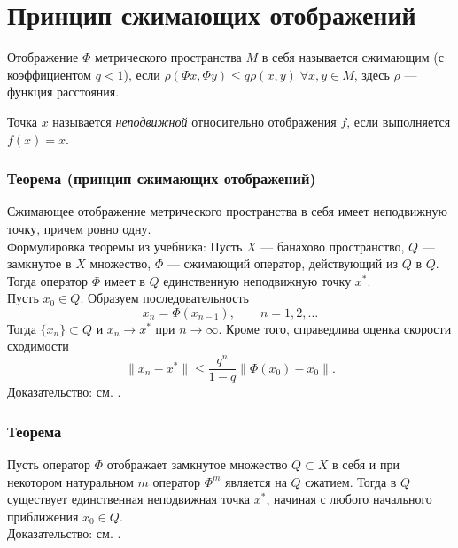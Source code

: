 \section{Принцип сжимающих отображений}
Отображение $\Phi$ метрического пространства $M$ в себя называется сжимающим (с коэффициентом $q < 1$), если $\rho(\Phi x,\Phi y) \leqslant q\rho(x,y)\; \forall x,y \in M$, здесь $\rho$ --- функция расстояния.

Точка $x$ называется \textit{неподвижной} относительно отображения $f$, если выполняется $f(x) = x$.

\subsubsection*{Теорема (принцип сжимающих отображений)}
Сжимающее отображение метрического пространства в себя имеет неподвижную точку, причем ровно одну.\\

Формулировка теоремы из учебника: Пусть $X$ --- банахово пространство, $Q$ --- замкнутое в $X$ множество, $\Phi$ --- сжимающий оператор, действующий из $Q$ в $Q$.\\
Тогда оператор $\Phi$ имеет в $Q$ единственную неподвижную точку $x^*$.\\
Пусть $x_0 \in Q$. Образуем последовательность
$$x_n = \Phi(x_{n-1}), \qquad n = 1, 2, \dots$$
Тогда $\{x_n\} \subset Q$ и $x_n \to x^*$ при $n \to \infty$. Кроме того, справедлива оценка скорости сходимости
$$\| x_n - x^*\| \leqslant \frac{q^n}{1 - q}\|\Phi (x_0) - x_0\|.$$
Доказательство: см. \cite[с.~381]{trenogin}.

\subsubsection*{Теорема}
Пусть оператор $\Phi$ отображает замкнутое множество $Q \subset X$ в себя и при некотором натуральном $m$ оператор $\Phi^m$ является на $Q$ сжатием. Тогда в $Q$ существует единственная неподвижная точка $x^*$, начиная с любого начального приближения $x_0 \in Q$.\\
Доказательство: см. \cite[с.~382]{trenogin}.

